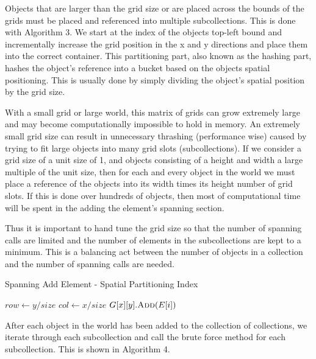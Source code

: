 \documentclass[conference]{IEEEtran}
\begin{document}
Objects that are larger than the grid size or are placed across the bounds of the grids must be placed and referenced into multiple subcollections. This is done with Algorithm 3. We start at the index of the objects top-left bound and incrementally increase the grid position in the x and y directions and place them into the correct container. This partitioning part, also known as the hashing part, hashes the object's reference into a bucket based on the objects spatial positioning. This is usually done by simply dividing the object's spatial position by the grid size.

With a small grid or large world, this matrix of grids can grow extremely large and may become computationally impossible to hold in memory. An extremely small grid size can result in unnecessary thrashing (performance wise) caused by trying to fit large objects into many grid slots (subcollections). If we consider a grid size of a unit size of 1, and objects consisting of a height and width a large multiple of the unit size, then for each and every object in the world we must place a reference of the objects into its width times its height number of grid slots. If this is done over hundreds of objects, then most of computational time will be spent in the adding the element's spanning section.

Thus it is important to hand tune the grid size so that the number of spanning calls are limited and the number of elements in the subcollections are kept to a minimum. This is a balancing act between the number of objects in a collection and the number of spanning calls are needed.

\begin{algorithm}
\caption{Spanning Add Element - Spatial Partitioning Index}
\begin{algorithmic}[1]
				\State $row \leftarrow y / size$
				\State $col \leftarrow x / size$
					\State $G[x][y].\Call{Add}{E[i]}$
				\EndIf
			\EndFor
		\EndFor
	\EndFor
\EndFunction
\end{algorithmic}
\end{algorithm}

After each object in the world has been added to the collection of collections, we iterate through each subcollection and call the brute force method for each subcollection. This is shown in Algorithm 4.
\end{document}
